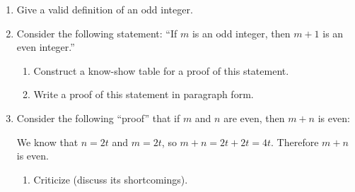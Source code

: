 \documentclass[12pt]{article}
\begin{document}
\begin{enumerate}
\begin{enumerate}
  \end{enumerate}

%

\item Give a valid definition of an odd integer.
  
\item  Consider the following statement:
 ``If $m$ is an odd integer, then $m{+}1$ is an even integer.''   %

  \begin{enumerate}
  \item   Construct a know-show table for a proof of this statement.

   \item     Write a proof of this statement in paragraph form.
  \end{enumerate}

\item  Consider the following   ``proof'' that if $m$ and $n$ are even, then $m{+}n$ is even:

  We know that $n=2t$ and $m=2t$, so $m{+}n=2t+2t= 4t$.  Therefore $m{+}n$ is even.


  \begin{enumerate}
   \item   Criticize (discuss its shortcomings).
  

\end{enumerate}
\end{enumerate}
\end{document}
